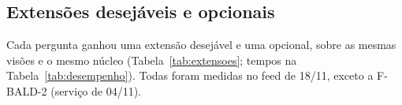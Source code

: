 \subsection{Extensões desejáveis e opcionais}\label{sec:extensoes}

Cada pergunta ganhou uma extensão desejável e uma opcional, sobre as mesmas visões e o mesmo
núcleo (Tabela~\ref{tab:extensoes}; tempos na Tabela~\ref{tab:desempenho}). Todas foram
medidas no feed de 18/11, exceto a F-BALD-2 (serviço de 04/11).

